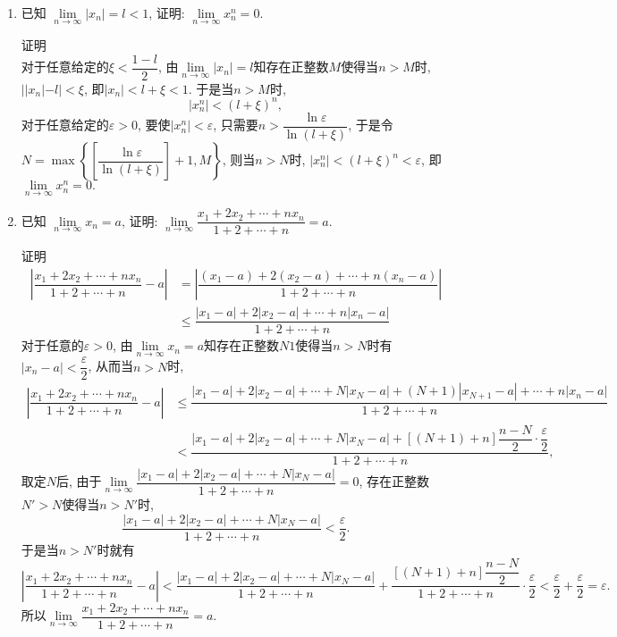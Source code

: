 \documentclass[UTF8,a4paper,20pt]{article}
\begin{document}
\begin{enumerate}
\item {\large\kaishu 已知 $\lim\limits_{n \to \infty}|x_n|=l<1$, 证明: $\lim\limits_{n \to \infty} x_n^n=0.$}

{\heiti 证明}\\
对于任意给定的$\xi<\dfrac{1-l}{2}$, 由$\lim\limits_{n \to \infty}|x_n|=l$知存在正整数$M$使得当$n>M$时, $||x_n|-l|<\xi$, 即$|x_n|<l+\xi<1$. 于是当$n>M$时, 
\[
|x_n^n|< (l+\xi)^n, 
\]
对于任意给定的$\varepsilon>0$, 要使$|x_n^n|<\varepsilon$, 只需要$n>\dfrac{\ln\varepsilon}{\ln(l+\xi)}$, 于是令$N=\max\left\{\left[\dfrac{\ln\varepsilon}{\ln(l+\xi)}\right]+1, M\right\}$, 则当$n>N$时, $|x_n^n|< (l+\xi)^n<\varepsilon$, 即$\lim\limits_{n \to \infty} x_n^n=0.$

\item {\large\kaishu 已知 $\lim\limits_{n \to \infty}x_n=a$, 证明: $\lim\limits_{n \to \infty}\dfrac{x_1+2x_2+\cdots+nx_n}{1+2+\cdots+n}=a.$}

{\heiti 证明}\\
\begin{equation*}
\begin{split}
\left|\dfrac{x_1+2x_2+\cdots+nx_n}{1+2+\cdots+n}-a\right|&=\left|\dfrac{(x_1-a)+2(x_2-a)+\cdots+n(x_n-a)}{1+2+\cdots+n}\right|\\&\leqslant\dfrac{|x_1-a|+2|x_2-a|+\cdots+n|x_n-a|}{1+2+\cdots+n}
\end{split}
\end{equation*}
对于任意的$\varepsilon>0$, 由$\lim\limits_{n \to \infty}x_n=a$知存在正整数$N1$使得当$n>N$时有$|x_n-a|<\dfrac{\varepsilon}{2}$, 从而当$n>N$时,
\begin{equation*}
\begin{split}
\left|\dfrac{x_1+2x_2+\cdots+nx_n}{1+2+\cdots+n}-a\right|&\leqslant\dfrac{|x_1-a|+2|x_2-a|+\cdots+N|x_N-a|+(N+1)|x_{N+1}-a|+\cdots+n|x_n-a|}{1+2+\cdots+n}\\
&<\dfrac{|x_1-a|+2|x_2-a|+\cdots+N|x_N-a|+[(N+1)+n]\dfrac{n-N}{2}\cdot\dfrac{\varepsilon}{2}}{1+2+\cdots+n},
\end{split}
\end{equation*}
取定$N$后, 由于$\lim\limits_{n \to \infty}\dfrac{|x_1-a|+2|x_2-a|+\cdots+N|x_N-a|}{1+2+\cdots+n}=0$, 存在正整数$N'>N$使得当$n>N'$时,
\[
\dfrac{|x_1-a|+2|x_2-a|+\cdots+N|x_N-a|}{1+2+\cdots+n}<\dfrac{\varepsilon}{2}.
\]
于是当$n>N'$时就有
\[
\left|\dfrac{x_1+2x_2+\cdots+nx_n}{1+2+\cdots+n}-a\right|<\dfrac{|x_1-a|+2|x_2-a|+\cdots+N|x_N-a|}{1+2+\cdots+n}+\dfrac{[(N+1)+n]\dfrac{n-N}{2}}{1+2+\cdots+n}\cdot\dfrac{\varepsilon}{2}<\dfrac{\varepsilon}{2}+\dfrac{\varepsilon}{2}=\varepsilon.
\]
所以$\lim\limits_{n \to \infty}\dfrac{x_1+2x_2+\cdots+nx_n}{1+2+\cdots+n}=a.$


\end{enumerate}
\end{document}
